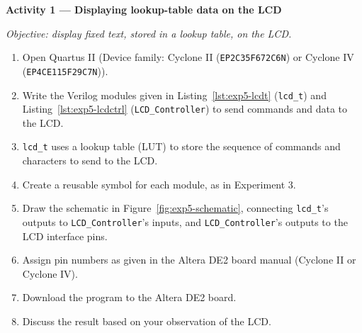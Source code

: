 \begin{procedure}

    \textbf{Activity 1 --- Displaying lookup-table data on the LCD}\vspace{2pt}

    \textit{Objective: display fixed text, stored in a lookup table, on the LCD.}

    \begin{enumerate}
        \item Open Quartus II (Device family: Cyclone II (\texttt{EP2C35F672C6N}) or Cyclone IV (\texttt{EP4CE115F29C7N})).
        \item Write the Verilog modules given in Listing~\ref{lst:exp5-lcdt} (\texttt{lcd\_t}) and Listing~\ref{lst:exp5-lcdctrl} (\texttt{LCD\_Controller}) to send commands and data to the LCD.
        \item \texttt{lcd\_t} uses a lookup table (LUT) to store the sequence of commands and characters to send to the LCD.
        \item Create a reusable symbol for each module, as in Experiment 3.
        \item Draw the schematic in Figure~\ref{fig:exp5-schematic}, connecting \texttt{lcd\_t}'s outputs to \texttt{LCD\_Controller}'s inputs, and \texttt{LCD\_Controller}'s outputs to the LCD interface pins.
        \item Assign pin numbers as given in the Altera DE2 board manual (Cyclone II or Cyclone IV).
        \item Download the program to the Altera DE2 board.
        \item Discuss the result based on your observation of the LCD.
    \end{enumerate}


\end{procedure}
